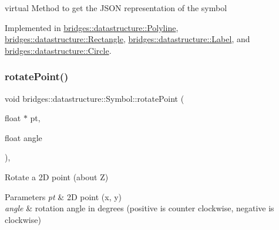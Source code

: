 virtual Method to get the J\+S\+ON representation of the symbol 

Implemented in \mbox{\hyperlink{classbridges_1_1datastructure_1_1_polyline_a176c06400a3b105fa651c69891381201}{bridges\+::datastructure\+::\+Polyline}}, \mbox{\hyperlink{classbridges_1_1datastructure_1_1_rectangle_ada89ed40d2515a3518084f5460ba8dac}{bridges\+::datastructure\+::\+Rectangle}}, \mbox{\hyperlink{classbridges_1_1datastructure_1_1_label_aa3b7c9e5630ecc8a2534e6db2a220e90}{bridges\+::datastructure\+::\+Label}}, and \mbox{\hyperlink{classbridges_1_1datastructure_1_1_circle_a796c88ccb8c5529d45aa7271a34fa3fe}{bridges\+::datastructure\+::\+Circle}}.

\mbox{\label{classbridges_1_1datastructure_1_1_symbol_ad40678e04bae69b4c03881148678e71e}} 
\subsubsection{\texorpdfstring{rotatePoint()}{rotatePoint()}}
{\footnotesize\ttfamily void bridges\+::datastructure\+::\+Symbol\+::rotate\+Point (\begin{DoxyParamCaption}\item[{float $\ast$}]{pt,  }\item[{float}]{angle }\end{DoxyParamCaption})\hspace{0.3cm}{\ttfamily [inline]}, {\ttfamily [protected]}}



Rotate a 2D point (about Z) 


\begin{DoxyParams}{Parameters}
{\em pt} & 2D point (x, y) \\
\hline
{\em angle} & rotation angle in degrees (positive is counter clockwise, negative is clockwise) \\
\hline
\end{DoxyParams}
\mbox{\label{classbridges_1_1datastructure_1_1_symbol_ac27131f6461a763e55f1127f3cf87932}} 
